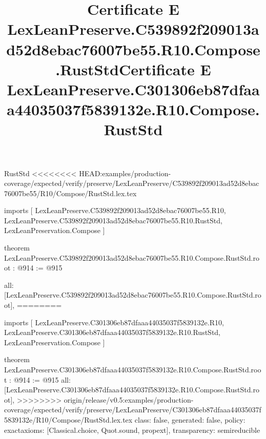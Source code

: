 \begin{lexlean}{RustStd}
<<<<<<<< HEAD:examples/production-coverage/expected/verify/preserve/LexLeanPreserve/C539892f209013ad52d8ebac76007be55/R10/Compose/RustStd.lex.tex
\title{Certificate E LexLeanPreserve.C539892f209013ad52d8ebac76007be55.R10.Compose.RustStd}
\begin{coremodule}
imports [
  LexLeanPreserve.C539892f209013ad52d8ebac76007be55.R10,
  LexLeanPreserve.C539892f209013ad52d8ebac76007be55.R10.RustStd,
  LexLeanPreservation.Compose
]

theorem LexLeanPreserve.C539892f209013ad52d8ebac76007be55.R10.Compose.RustStd.root : @914 := @915 {
  all: [LexLeanPreserve.C539892f209013ad52d8ebac76007be55.R10.Compose.RustStd.root],
========
\title{Certificate E LexLeanPreserve.C301306eb87dfaaa44035037f5839132e.R10.Compose.RustStd}
\begin{coremodule}
imports [
  LexLeanPreserve.C301306eb87dfaaa44035037f5839132e.R10,
  LexLeanPreserve.C301306eb87dfaaa44035037f5839132e.R10.RustStd,
  LexLeanPreservation.Compose
]

theorem LexLeanPreserve.C301306eb87dfaaa44035037f5839132e.R10.Compose.RustStd.root : @914 := @915 {
  all: [LexLeanPreserve.C301306eb87dfaaa44035037f5839132e.R10.Compose.RustStd.root],
>>>>>>>> origin/release/v0.5:examples/production-coverage/expected/verify/preserve/LexLeanPreserve/C301306eb87dfaaa44035037f5839132e/R10/Compose/RustStd.lex.tex
  class: false,
  generated: false,
  policy: exact{axioms: [Classical.choice, Quot.sound, propext]},
  transparency: semireducible
}


\end{coremodule}}
\end{coremodule}
\end{lexlean}
